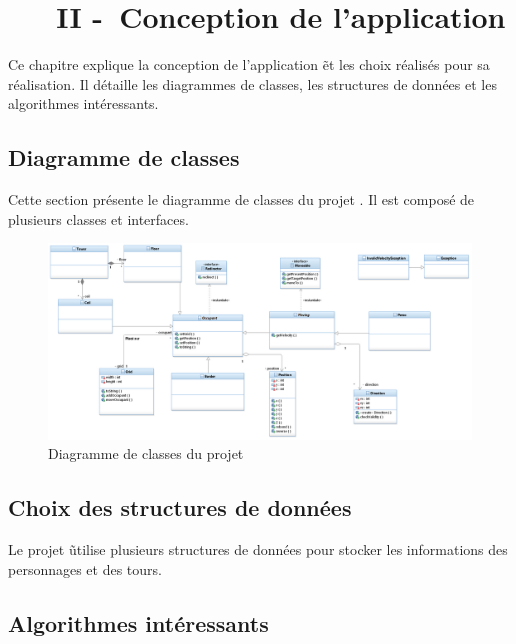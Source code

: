 \chapter[~~~CONCEPTION DE L'APPLICATION]{~~~II -~Conception de l’application}%
\label{refDev2}%

Ce chapitre explique la conception de l'application \nom\~et les choix réalisés pour sa réalisation. Il détaille les diagrammes de classes, les structures de données et les algorithmes intéressants.

\section{Diagramme de classes}

Cette section présente le diagramme de classes du projet \nom. Il est composé de plusieurs classes et interfaces.
\bigskip

\begin{figure}[!ht]
  \centering%
  \includegraphics[width=15.5cm]{assets/pictures/ToursInfernales_Main.png} 
  \caption{Diagramme de classes du projet}%
\end{figure}
\bigskip

\section{Choix des structures de données}

Le projet \nom\~utilise plusieurs structures de données pour stocker les informations des personnages et des tours.

\section{Algorithmes intéressants}


